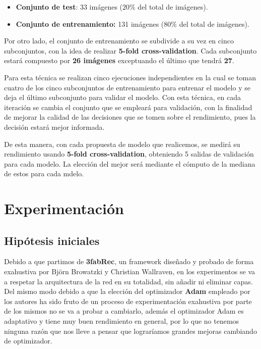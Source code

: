         \begin{itemize}
            \item \textbf{Conjunto de test}: 33 imágenes ($20\%$ del total de imágenes).
            \item \textbf{Conjunto de entrenamiento:} 131 imágenes ($80\%$ del total de imágenes).
        \end{itemize}

        \noindent Por otro lado, el conjunto de entrenamiento se subdivide a su vez en cinco subconjuntos, con la idea de realizar \textbf{5-fold cross-validation}. Cada subconjunto estará compuesto por \textbf{26 imágenes} exceptuando el último que tendrá \textbf{27}.
        
        \medskip

        \noindent Para esta técnica se realizan cinco ejecuciones independientes en la cual se toman cuatro de los cinco subconjuntos de entrenamiento para entrenar el modelo y se deja el último subconjunto para validar el modelo. Con esta técnica, en cada iteración se cambia el conjunto que se empleará para validación, con la finalidad de mejorar la calidad de las decisiones que se tomen sobre el rendimiento, pues la decisión estará mejor informada. 

        \medskip

        \noindent De esta manera, con cada propuesta de modelo que realicemos, se medirá su rendimiento usando \textbf{5-fold cross-validation}, obteniendo 5 salidas de validación para cada modelo. La elección del mejor será mediante el cómputo de la mediana de estos para cada mdelo.


\section{Experimentación}
    \subsection{Hipótesis iniciales}
        \noindent Debido a que partimos de \textbf{3fabRec}, un framework diseñado y probado de forma exahustiva por Björn Browatzki y Christian Wallraven, en los experimentos se va a respetar la arquitectura de la red en su totalidad, sin añadir ni eliminar capas. Del mismo modo debido a que la elección del optimizador \textbf{Adam} empleado por los autores ha sido fruto de un proceso de experimentación exahustiva por parte de los mismos no se va a probar a cambiarlo, además el optimizador Adam es adaptativo y tiene muy buen rendimiento en general, por lo que no tenemos ninguna razón que nos lleve a pensar que lograríamos grandes mejoras cambiando de optimizador.

